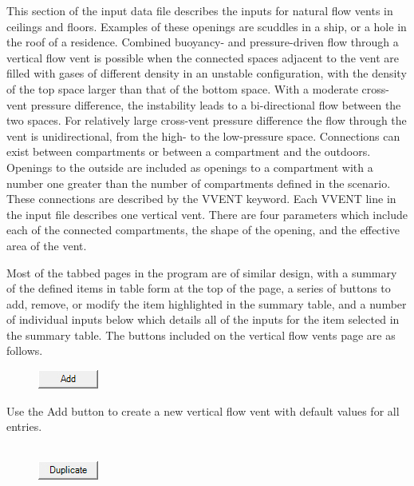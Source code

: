 This section of the input data file describes the inputs for natural flow vents in ceilings and floors. Examples of these openings are scuddles in a ship, or a hole in the roof of a residence. Combined buoyancy- and pressure-driven flow through a vertical flow vent is possible when the connected spaces adjacent to the vent are filled with gases of different density in an unstable configuration, with the density of the top space larger than that of the bottom space. With a moderate cross-vent pressure difference, the instability leads to a bi-directional flow between the two spaces. For relatively large cross-vent pressure difference the flow through the vent is unidirectional, from the high- to the low-pressure space.
Connections can exist between compartments or between a compartment and the outdoors. Openings to the outside are included as openings to a compartment with a number one greater than the number of compartments defined in the scenario.  These connections are described by the VVENT keyword. Each VVENT line in the input file describes one vertical vent.  There are four parameters which include each of the connected compartments, the shape of the opening, and the effective area of the vent.

Most of the tabbed pages in the program are of similar design, with a summary of the defined items in table form at the top of the page, a series of buttons to add, remove, or modify the item highlighted in the summary table, and a number of individual inputs below which details all of the inputs for the item selected in the summary table. The buttons included on the vertical flow vents page are as follows.

\begin{figure}
  \includegraphics[width=0.781in]{FIGURES/Input_File/Add_Button}
\end{figure}

Use the Add button to create a new vertical flow vent with default values for all entries. \\~ \\

\begin{figure}
  \includegraphics[width=0.781in]{FIGURES/Input_File/Duplicate_Button}
\end{figure}

